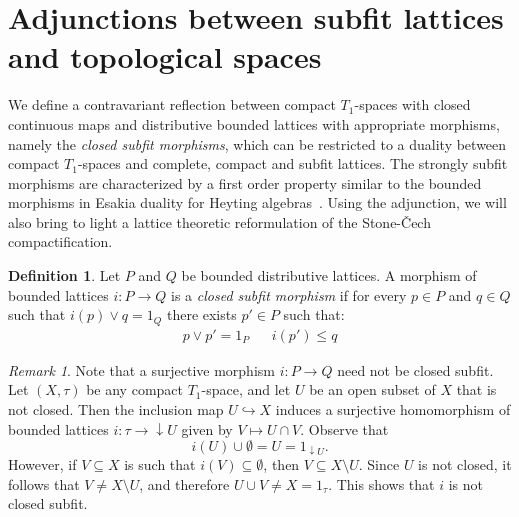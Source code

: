 \documentclass{article}
\theoremstyle{plain}
\theoremstyle{definition}
\newtheorem{definition}[theorem]{Definition}
\theoremstyle{remark}
\newtheorem{remark}[theorem]{Remark}
\newcommand{\0}{\mathbbm 0}
\newcommand{\1}{\mathbbm 1}
\newcommand{\2}{\mathbbm 2}
\begin{document}
\section{Adjunctions between subfit lattices and topological spaces}
\label{sec:adjunctions}
We define a contravariant reflection between compact $T_1$-spaces with closed continuous maps and distributive bounded lattices with appropriate morphisms, namely the \emph{closed subfit morphisms}, which can be restricted to a duality between compact $T_1$-spaces  and complete, compact and subfit lattices. The strongly subfit morphisms are characterized by  a first order property similar to the bounded morphisms in Esakia duality for Heyting algebras~\cite{Esakia}. Using the adjunction, we will also bring to light a lattice theoretic reformulation of the Stone-\v{C}ech compactification.


\begin{definition}
\label{def:closedmorphism}
Let $P$ and $Q$ be bounded distributive lattices. A  morphism of bounded lattices $i: P \to Q$ is a \emph{closed subfit morphism} if for every $p \in P$ and $q \in Q$ such that $ i(p) \vee q = 1_Q$ there exists $p' \in P$ such that: 
 \begin{align*}
      p \vee p'=1_P
&& i(p') \leq q
 \end{align*}
\end{definition}


\begin{remark}
Note that a surjective morphism \( i: P \to Q \) need not be closed subfit. Let \( (X, \tau) \) be any compact \( T_1 \)-space, and let \( U \) be an open subset of \( X \) that is not closed. Then the inclusion map \( U \hookrightarrow X \) induces a surjective homomorphism of bounded lattices 
\(i \colon \tau \to {\downarrow}U\) given by \(V \mapsto U \cap V.
\)
Observe that
\[
i(U) \cup \emptyset = U = 1_{{\downarrow}U}.
\]
However, if \( V \subseteq X \) is such that \( i(V) \subseteq \emptyset \), then \( V \subseteq X \setminus U \). Since \( U \) is not closed, it follows that \( V \neq X \setminus U \), and therefore \( U \cup V \neq X = 1_\tau \). This shows that \( i \) is not closed subfit.
\end{remark}
\end{document}
